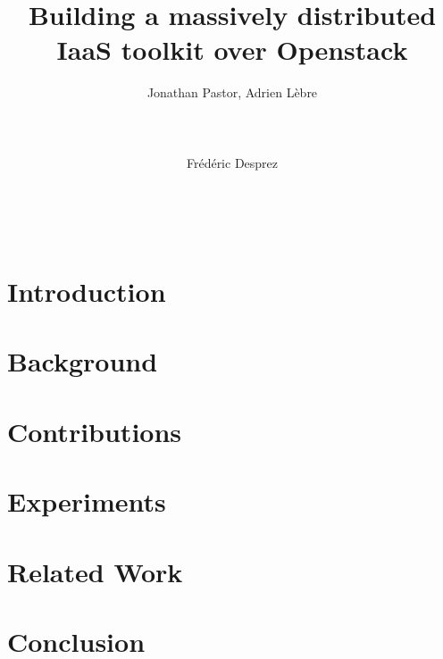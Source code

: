\documentclass{acm/acm_proc_article-sp}
\begin{document}
\title{Building a massively distributed IaaS toolkit over Openstack}

\author{
%
Jonathan Pastor, Adrien Lèbre\\
       \\
       \\
       \\
\alignauthor
Frédéric Desprez\\
       \\
       \\
       \\
}

\maketitle




\section{Introduction}
\label{sec:intro} 


\section{Background}
\label{sec:back}


\section{Contributions}
\label{sec:contribs}


\section{Experiments}
\label{sec:exps}


\section{Related Work}
\label{sec:related}


\section{Conclusion}
\label{sec:con}





\end{document}
